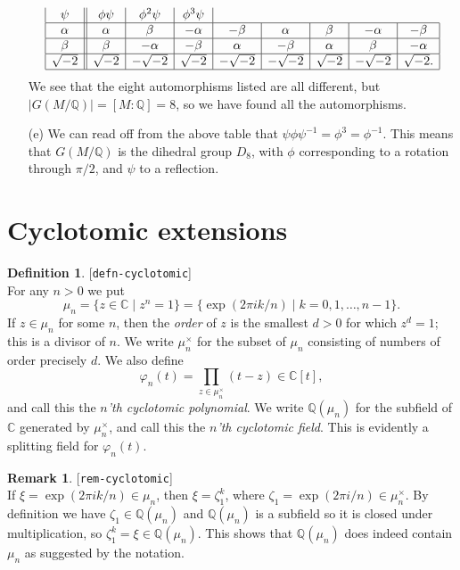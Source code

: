 \documentclass{amsart}
\newcommand{\lbl}[1]{\label{#1}\textup{[\texttt{#1}]}\ \\}
\newcommand{\lbl}{\label}
\newcommand{\Q}         {{\mathbb{Q}}}
\newcommand{\C}         {{\mathbb{C}}}
\newcommand{\al}        {\alpha}
\newcommand{\bt}        {\beta}
\newcommand{\zt}        {\zeta}
\newcommand{\vph}       {\varphi}
\newcommand{\st}        {\;|\;}
\newcommand{\tm}        {\times}
\renewcommand{\:}{\colon}
\newenvironment{solution}{\SolutionInline}{\endSolutionInline}
\theoremstyle{definition}
\newtheorem{remark}[theorem]{Remark}
\newtheorem{definition}[theorem]{Definition}
\renewenvironment{solution}{\SolutionAtEnd}{\endSolutionAtEnd}
\begin{document}
\begin{solution}
\begin{itemize}
\[\begin{array}{|c||c|c|c|c|c|c|c|c|}
         \psi & \phi\psi & \phi^2\psi & \phi^3\psi \\ \hline
       \al & \al & \bt & -\al & -\bt & \al & \bt & -\al & -\bt \\ \hline
       \bt & \bt & -\al & -\bt & \al & -\bt & \al & \bt & -\al \\ \hline
       \sqrt{-2} & \sqrt{-2} & -\sqrt{-2} & \sqrt{-2} & -\sqrt{-2} &
                   -\sqrt{-2} & \sqrt{-2} & -\sqrt{-2} & \sqrt{-2}. \\
       \hline
      \end{array}
   \]
   We see that the eight automorphisms listed are all different, but
   $|G(M/\Q)|=[M:\Q]=8$, so we have found all the automorphisms.
  \item[(e)] We can read off from the above table that
   $\psi\phi\psi^{-1}=\phi^3=\phi^{-1}$.  This means that $G(M/\Q)$ is
   the dihedral group $D_8$, with $\phi$ corresponding to a rotation
   through $\pi/2$, and $\psi$ to a reflection.
 \end{itemize}
\end{solution}


\section{Cyclotomic extensions}
\label{sec-cyclotomic}

\begin{definition}\lbl{defn-cyclotomic}
 For any $n>0$ we put 
 \[ \mu_n = \{z\in\C\st z^n=1\} = 
     \{\exp(2\pi ik/n) \st k=0,1,\dotsc,n-1\}.
 \]
 If $z\in\mu_n$ for some $n$, then the \emph{order} of $z$ is the
 smallest $d>0$ for which $z^d=1$; this is a divisor of $n$.  We write
 $\mu_n^\tm$ for the subset of $\mu_n$ consisting of numbers of order
 precisely $d$.  We also define
 \[ \vph_n(t) = \prod_{z\in\mu_n^\tm}(t-z) \in \C[t], \]
 and call this the \emph{$n$'th cyclotomic polynomial}.  We write
 $\Q(\mu_n)$ for the subfield of $\C$ generated by $\mu_n^\tm$, and
 call this the \emph{$n$'th cyclotomic field}.  This is evidently a
 splitting field for $\vph_n(t)$.
\end{definition}

\begin{remark}\lbl{rem-cyclotomic}
 If $\xi=\exp(2\pi ik/n)\in\mu_n$, then $\xi=\zt_1^k$, where
 $\zt_1=\exp(2\pi i/n)\in\mu_n^\tm$.  By definition we have
 $\zt_1\in\Q(\mu_n)$ and $\Q(\mu_n)$ is a subfield so it is closed
 under multiplication, so $\zt_1^k=\xi\in\Q(\mu_n)$.  This shows that
 $\Q(\mu_n)$ does indeed contain $\mu_n$ as suggested by the
 notation. 
\end{remark}
\end{document}
